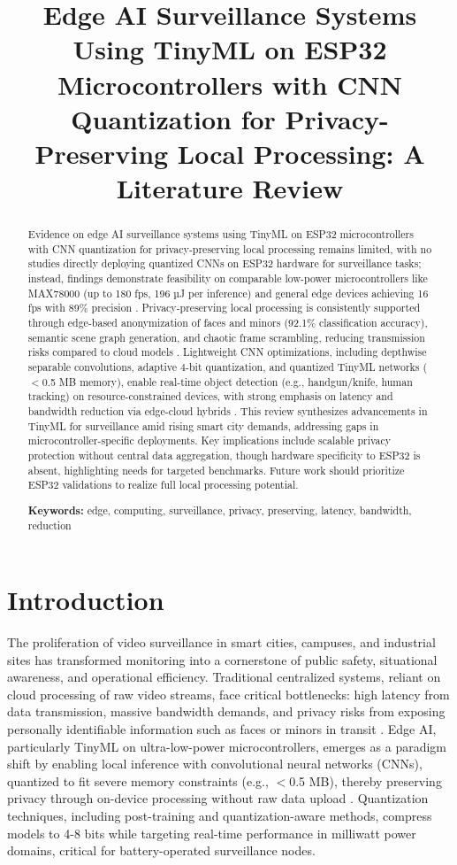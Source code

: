 \documentclass[12pt, a4paper]{article}
\title{\textbf{Edge AI Surveillance Systems Using TinyML on ESP32 Microcontrollers with CNN Quantization for Privacy-Preserving Local Processing: A Literature Review}}
\author{}
\date{}
\begin{document}
\maketitle

\begin{abstract}
Evidence on edge AI surveillance systems using TinyML on ESP32 microcontrollers with CNN quantization for privacy-preserving local processing remains limited, with no studies directly deploying quantized CNNs on ESP32 hardware for surveillance tasks; instead, findings demonstrate feasibility on comparable low-power microcontrollers like MAX78000 (up to 180 fps, 196 µJ per inference) and general edge devices achieving 16 fps with 89\% precision \cite{moosmann2023, zhao2020}. Privacy-preserving local processing is consistently supported through edge-based anonymization of faces and minors (92.1\% classification accuracy), semantic scene graph generation, and chaotic frame scrambling, reducing transmission risks compared to cloud models \cite{yuan2020, huang2023, fitwi2021}. Lightweight CNN optimizations, including depthwise separable convolutions, adaptive 4-bit quantization, and quantized TinyML networks ($<$0.5 MB memory), enable real-time object detection (e.g., handgun/knife, human tracking) on resource-constrained devices, with strong emphasis on latency and bandwidth reduction via edge-cloud hybrids \cite{zhao2020, chin2022, moosmann2023}. This review synthesizes advancements in TinyML for surveillance amid rising smart city demands, addressing gaps in microcontroller-specific deployments. Key implications include scalable privacy protection without central data aggregation, though hardware specificity to ESP32 is absent, highlighting needs for targeted benchmarks. Future work should prioritize ESP32 validations to realize full local processing potential.

\textbf{Keywords:} edge, computing, surveillance, privacy, preserving, latency, bandwidth, reduction
\end{abstract}

\section{Introduction}
The proliferation of video surveillance in smart cities, campuses, and industrial sites has transformed monitoring into a cornerstone of public safety, situational awareness, and operational efficiency. Traditional centralized systems, reliant on cloud processing of raw video streams, face critical bottlenecks: high latency from data transmission, massive bandwidth demands, and privacy risks from exposing personally identifiable information such as faces or minors in transit \cite{myneni2022, yuan2020}. Edge AI, particularly TinyML on ultra-low-power microcontrollers, emerges as a paradigm shift by enabling local inference with convolutional neural networks (CNNs), quantized to fit severe memory constraints (e.g., $<$0.5 MB), thereby preserving privacy through on-device processing without raw data upload \cite{moosmann2023}. Quantization techniques, including post-training and quantization-aware methods, compress models to 4-8 bits while targeting real-time performance in milliwatt power domains, critical for battery-operated surveillance nodes.
\end{document}
